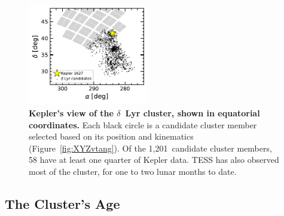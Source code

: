 \documentclass[12pt,modern,twocolumn,tighten,linenumbers,trackchanges]{aastex63}
\newcommand{\nkinematic}{1{,}201} %
\begin{document}
\begin{figure}[t]
	\begin{center}
		\leavevmode
		\includegraphics[width=0.47\textwidth]{f2.pdf}
	\end{center}
	\vspace{-0.7cm}
	\caption{
    {\bf Kepler's view of the $\delta$~Lyr cluster, shown in equatorial
    	coordinates.} Each black circle
    is a candidate cluster member selected based on its position and kinematics (Figure~\ref{fig:XYZvtang}).  Of
    the \nkinematic\ candidate cluster members, 58 have at least one
    quarter of Kepler data.  TESS has also observed most of the
    cluster, for one to two lunar months to date.
		\label{fig:skychart}
	}
\end{figure}


\subsection{The Cluster's Age}
\label{sec:clusterage}
\end{document}

